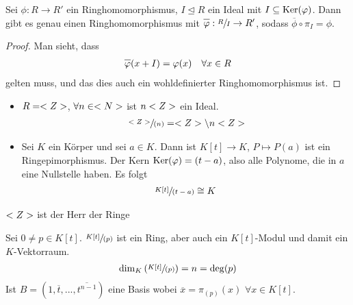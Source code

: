 \begin{proposition}
	Sei $\phi:R\to R'$ ein Ringhomomorphismus, $I\unlhd R$ ein Ideal mit $I\subseteq \operatorname{Ker}(\varphi)$. Dann gibt es genau einen Ringhomomorphismus mit $\overline{\phi}:\qraum{R}{I}\to R'$, sodass $\overline{\phi}\circ \pi_I=\phi$.
	\begin{center}
	\end{center}
\end{proposition}
\begin{proof}
	Man sieht, dass 
	\begin{align}
		\overline{\phi}(x+I)=\phi(x)\quad\forall x\in R\notag
	\end{align}
	gelten muss, und das dies auch ein wohldefinierter Ringhomomorphismus ist.
\end{proof}

\begin{example}
	\begin{itemize}
		\item $R=<Z>$, $\forall n\in<N>$ ist $n<Z>$ ein Ideal.
		\begin{align}
			\sfrac{<Z>}{(n)}=<Z>\backslash n<Z>\notag
		\end{align}
		\item Sei $K$ ein Körper und sei $a\in K$. Dann ist $K[t]\to K$, $P\mapsto P(a)$ ist ein Ringepimorphismus. Der Kern $\operatorname{Ker}(\varphi)=(t-a)$, also alle Polynome, die in $a$ eine Nullstelle haben. Es folgt
		\begin{align}
			\sfrac{K[t]}{(t-a)}\cong K\notag
		\end{align}
	\end{itemize}
\end{example}

\smiley{} $<Z>$ ist der Herr der Ringe \smiley{}

\begin{example}
	Sei $0\neq p\in K[t]$. $\sfrac{K[t]}{(p)}$ ist ein Ring, aber auch ein $K[t]$-Modul und damit ein $K$-Vektorraum.
	\begin{align}
		\dim_K\left( \sfrac{K[t]}{(p)}\right) = n= \deg(p)\notag
	\end{align}
	Ist $B=(1,\overline{t},...,\overline{t^{n-1}})$ eine Basis wobei $\overline{x}=\pi_{(p)}(x)$ $\forall x\in K[t]$.
\end{example}
